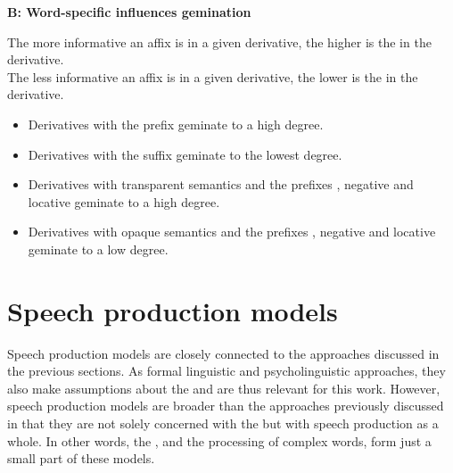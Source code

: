 {{	
\noindent	\textbf{B: \hspace{0.5cm} Word-specific  influences gemination}
	
\noindent	The more informative an affix is in a given derivative, the higher is the  in the derivative.\\ 


	
\noindent	The less informative an affix is in a given derivative, the lower is the  in the derivative.%
	
			\begin{itemize}
				
				\item Derivatives with the prefix  geminate to a high degree.		
				\item Derivatives with the suffix  geminate to the lowest degree.
				\item  Derivatives with transparent semantics and the prefixes , negative  and locative  geminate to a high degree.	
				\item  Derivatives with opaque semantics and the prefixes , negative  and locative  geminate to a low degree.	\\
			\end{itemize}	



 
\section{Speech production models}\label{speech production models}

Speech production models are closely connected to the approaches discussed in the previous sections. As formal linguistic and psycholinguistic approaches, they also make assumptions about the  and are thus relevant for this work. However, speech production models are broader than the approaches previously discussed in that they are not solely concerned with the  but with speech production as a whole. In other words, the , and the processing of complex words, form just a small part of these models.

}}
